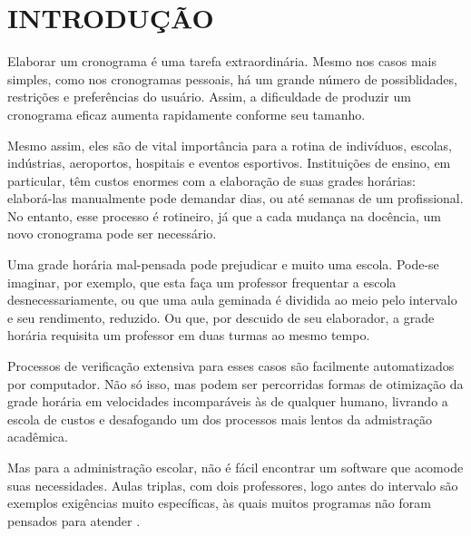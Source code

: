 \documentclass[12pt,a4paper]{article}
\begin{document}
	\begingroup
		\let\clearpage\relax
		\vspace{-1cm} %
		\tableofcontents
	\endgroup

	\newpage


	\section{INTRODUÇÃO}



		\par Elaborar um cronograma é uma tarefa extraordinária. Mesmo nos casos mais simples, como nos cronogramas pessoais, há um grande número de possiblidades, restrições e preferências do usuário. Assim, a dificuldade de produzir um cronograma eficaz aumenta rapidamente conforme seu tamanho.

		\par Mesmo assim, eles são de vital importância para a rotina de indivíduos, escolas, indústrias, aeroportos, hospitais e eventos esportivos. Instituições de ensino, em particular, têm custos enormes com a elaboração de suas grades horárias: elaborá-las manualmente pode demandar dias, ou até semanas \cite{appleby,nikita} de um profissional. No entanto, esse processo é rotineiro, já que a cada mudança na docência, um novo cronograma pode ser necessário.

		\par Uma grade horária mal-pensada pode prejudicar e muito uma escola. Pode-se imaginar, por exemplo, que esta faça um professor frequentar a escola desnecessariamente, ou que uma aula geminada é dividida ao meio pelo intervalo e seu rendimento, reduzido. Ou que, por descuido de seu elaborador, a grade horária requisita um professor em duas turmas ao mesmo tempo.

		\par Processos de verificação extensiva para esses casos são facilmente automatizados por computador. Não só isso, mas podem ser percorridas formas de otimização da grade horária em velocidades incomparáveis às de qualquer humano, livrando a escola de custos e desafogando um dos processos mais lentos da admistração acadêmica.

		\par Mas para a administração escolar, não é fácil encontrar um software que acomode suas necessidades. Aulas triplas, com dois professores, logo antes do intervalo são exemplos exigências muito específicas, às quais muitos programas não foram pensados para atender \cite{nikita, carter1995}.
\end{document}
